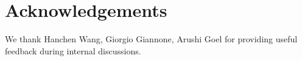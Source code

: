 \documentclass{article} \usepackage{iclr2021_conference,times}
\begin{document}
\section{Acknowledgements}
We thank Hanchen Wang, Giorgio Giannone, Arushi Goel for providing useful feedback during internal discussions.
\end{document}
